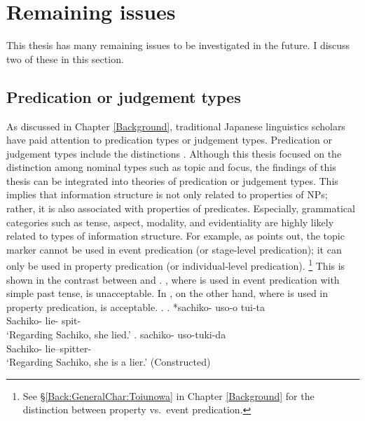 \section{Remaining issues}

This thesis has many remaining issues to be investigated in the future.
I discuss two of these in this section.


\subsection{Predication or judgement types}

As discussed in Chapter \ref{Background},
traditional Japanese linguistics scholars have paid attention to
predication types or judgement types.
Predication or judgement types include the distinctions
\cite{matsushita28,yamada36,mio48,kuroda72,masuoka08,kageyama12}.
Although this thesis focused on the distinction among nominal types such as topic and focus,
the findings of this thesis can be integrated into theories of predication or judgement types.
This implies that information structure is not only related to properties of NPs;
rather, it is also associated with properties of predicates.
Especially, grammatical categories such as tense, aspect, modality, and evidentiality are highly likely related to types of information structure.
For example, as  points out,
the topic marker  cannot be used in event predication (or stage-level predication);
it can only be used in property predication (or individual-level predication).%
 \footnote{
 See \S \ref{Back:GeneralChar:Toiunowa} in Chapter \ref{Background}
 for the distinction between property vs.~event predication.
 }
This is shown in the contrast between \Next[a] and \Next[b].
\Next[a], where  is used in event predication with simple past tense,
is unacceptable.
In \Next[b],
on the other hand, where  is used in property predication,
is acceptable.
%
\ex.
 \ag. *sachiko- uso-o tui-ta \\
      Sachiko- lie- spit- \\
      `Regarding Sachiko, she lied.'
     \hfill{\cite[p.~96]{masuoka12}}
 \bg. sachiko- uso-tuki-da \\
      Sachiko- lie--spitter- \\
      `Regarding Sachiko, she is a lier.'
     \hfill{(Constructed)}


